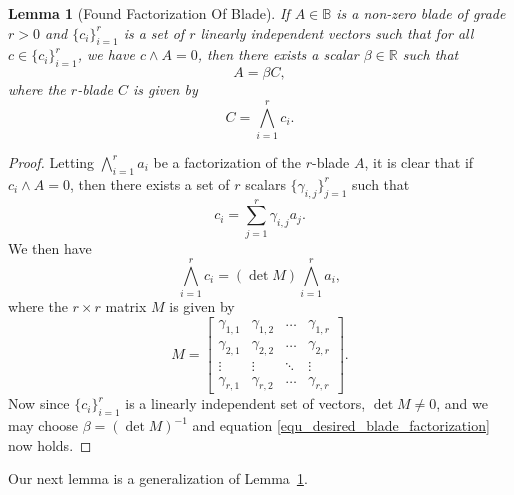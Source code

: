 \documentclass{birkjour}
\newtheorem{lem}[thm]{Lemma}
\theoremstyle{definition}
\theoremstyle{remark}
\numberwithin{equation}{section}
\newcommand{\R}{\mathbb{R}}
\newcommand{\B}{\mathbb{B}}
\begin{document}
\begin{lem}[Found Factorization Of Blade]\label{lem_desired_blade_factorization}
If $A\in\B$ is a non-zero blade of grade $r>0$ and $\{c_i\}_{i=1}^r$ is a set
of $r$ linearly independent vectors such that for all $c\in\{c_i\}_{i=1}^r$, we have
$c\wedge A=0$, then there exists a scalar $\beta\in\R$ such that
\begin{equation}\label{equ_desired_blade_factorization}
A = \beta C,
\end{equation}
where the $r$-blade $C$ is given by
\begin{equation}
C=\bigwedge_{i=1}^r c_i.
\end{equation}
\end{lem}
\begin{proof}
Letting $\bigwedge_{i=1}^r a_i$ be a factorization of the $r$-blade $A$, it is clear
that if $c_i\wedge A=0$, then there exists a set of $r$ scalars $\{\gamma_{i,j}\}_{j=1}^r$
such that
\begin{equation}\label{equ_c_i}
c_i=\sum_{j=1}^r\gamma_{i,j}a_j.
\end{equation}
We then have
\begin{equation}
\bigwedge_{i=1}^r c_i=(\det M)\bigwedge_{i=1}^r a_i,
\end{equation}
where the $r\times r$ matrix $M$ is given by
\begin{equation}
M = \left[\begin{array}{cccc}
\gamma_{1,1} & \gamma_{1,2} & \dots & \gamma_{1,r} \\
\gamma_{2,1} & \gamma_{2,2} & \dots & \gamma_{2,r} \\
\vdots & \vdots & \ddots & \vdots \\
\gamma_{r,1} & \gamma_{r,2} & \dots & \gamma_{r,r}
\end{array}\right].
\end{equation}
Now since $\{c_i\}_{i=1}^r$ is a linearly independent set of vectors,
$\det M\neq 0$, and we may choose $\beta=(\det M)^{-1}$ and
equation \eqref{equ_desired_blade_factorization} now holds.
\end{proof}

Our next lemma is a generalization of Lemma~\ref{lem_desired_blade_factorization}.
\end{document}
